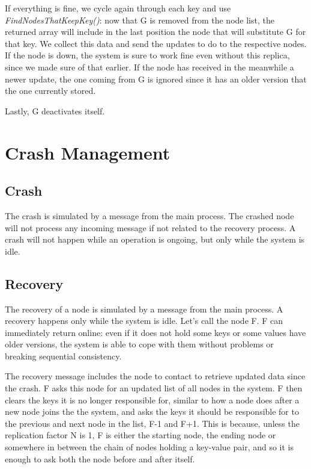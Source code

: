 \documentclass[12pt, a4paper]{article}
\begin{document}
    If everything is fine, we cycle again through each key and use \textit{FindNodesThatKeepKey()}: now that G is removed from the node list, the returned array will include in the last position the node that will substitute G for that key. We collect this data and send the updates to do to the respective nodes. If the node is down, the system is sure to work fine even without this replica, since we made sure of that earlier. If the node has received in the meanwhile a newer update, the one coming from G is ignored since it has an older version that the one currently stored.

    Lastly, G deactivates itself. 
    
    \pagebreak
    \section{Crash Management}
    \subsection{Crash}
    The crash is simulated by a message from the main process. The crashed node will not process any incoming message if not related to the recovery process. A crash will not happen while an operation is ongoing, but only while the system is idle.
    
    \subsection{Recovery}
    The recovery of a node is simulated by a message from the main process. A recovery happens only while the system is idle. Let's call the node F. F can immediately return online: even if it does not hold some keys or some values have older versions, the system is able to cope with them without problems or breaking sequential consistency.
    
    The recovery message includes the node to contact to retrieve updated data since the crash. F asks this node for an updated list of all nodes in the system. F then clears the keys it is no longer responsible for, similar to how a node does after a new node joins the the system, and asks the keys it should be responsible for to the previous and next node in the list, F-1 and F+1. This is because, unless the replication factor N is 1, F is either the starting node, the ending node or somewhere in between the chain of nodes holding a key-value pair, and so it is enough to ask both the node before and after itself.
\end{document}
